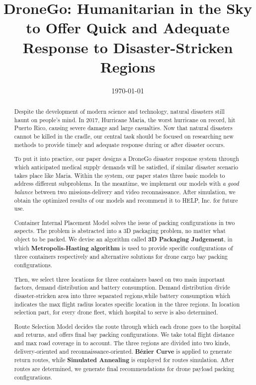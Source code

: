 \documentclass{mcmthesis}
\begin{document}
\linespread{0.6} %
\setlength{\parskip}{0.5\baselineskip} %
\title{DroneGo: Humanitarian in the Sky to Offer Quick and Adequate Response to Disaster-Stricken Regions}

\date{\today}
	\begin{abstract}

Despite the development of modern science and technology, natural disasters still haunt on people's mind. In 2017, Hurricane Maria, the worst hurricane on record, hit Puerto Rico, causing severe damage and large casualties. Now that natural disasters cannot be killed in the cradle, our central task should be focused on researching new methods to provide timely and adequate response during or after disaster occurs.

To put it into practice, our paper designs a DroneGo disaster response system through which anticipated medical supply demands will be satisfied, if similar disaster scenario takes place like Maria. Within the system, our paper states three basic models to address different subproblems. In the meantime, we implement our models with \emph{a good balance} between two missions-delivery and video reconnaissance. After simulation, we obtain the optimized results of our models and recommend it to HELP, Inc. for future use.

Container Internal Placement Model solves the issue of packing configurations in two aspects. The problem is abstracted into a 3D packaging problem, no matter what object to be packed. We devise an algorithm called \textbf{3D Packaging Judgement}, in which \textbf{Metropolis-Hasting algorithm} is used to provide specific configurations of three containers respectively and alternative solutions for drone cargo bay packing configurations.

Then, we select three locations for three containers based on two main important factors, demand distribution and battery consumption. Demand distribution divide disaster-stricken area into three separated regions,while battery consumption which indicates the max flight radius locates specific location in the three regions. In location selection part, for every drone fleet, which hospital to serve is also determined.

Route Selection Model decides the route through which each drone goes to the hospital and returns, and offers final bay packing configurations. We take total flight distance and max road coverage in to account. The three regions are divided into two kinds, delivery-oriented and reconnaissance-oriented. \textbf{B\'{e}zier Curve} is applied to generate return routes, while \textbf{Simulated Annealing} is employed for routes simulation. After routes are determined, we generate final recommendations for drone payload packing configurations.


\end{abstract}
\end{document}
